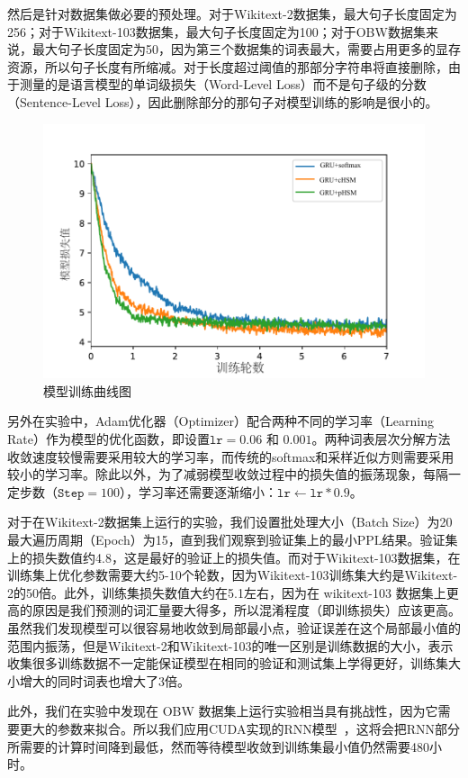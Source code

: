 然后是针对数据集做必要的预处理。对于Wikitext-2数据集，最大句子长度固定为256；对于Wikitext-103数据集，最大句子长度固定为100；对于OBW数据集来说，最大句子长度固定为50，因为第三个数据集的词表最大，需要占用更多的显存资源，所以句子长度有所缩减。对于长度超过阈值的那部分字符串将直接删除，由于测量的是语言模型的单词级损失（Word-Level Loss）而不是句子级的分数（Sentence-Level Loss），因此删除部分的那句子对模型训练的影响是很小的。
\begin{figure}[!t]
  \centering
  \includegraphics[width=0.6\columnwidth]{./figures/learn2.pdf}
  \caption{模型训练曲线图}
\end{figure}

另外在实验中，Adam优化器（Optimizer）配合两种不同的学习率（Learning Rate）作为模型的优化函数，即设置$\mathtt{lr}  = 0.06$ 和 $0.001 $。两种词表层次分解方法收敛速度较慢需要采用较大的学习率，而传统的softmax和采样近似方则需要采用较小的学习率。除此以外，为了减弱模型收敛过程中的损失值的振荡现象，每隔一定步数（$\texttt{Step} =100$），学习率还需要逐渐缩小：$\texttt{lr} \leftarrow \texttt{lr}*0.9$。

对于在Wikitext-2数据集上运行的实验，我们设置批处理大小（Batch Size）为20最大遍历周期（Epoch）为15，直到我们观察到验证集上的最小$\mathrm{PPL}$结果。验证集上的损失数值约4.8，这是最好的验证上的损失值。而对于Wikitext-103数据集，在训练集上优化参数需要大约5-10个轮数，因为Wikitext-103训练集大约是Wikitext-2的50倍。此外，训练集损失数值大约在5.1左右，因为在 wikitext-103 数据集上更高的原因是我们预测的词汇量要大得多，所以混淆程度（即训练损失）应该更高。虽然我们发现模型可以很容易地收敛到局部最小点，验证误差在这个局部最小值的范围内振荡，但是Wikitext-2和Wikitext-103的唯一区别是训练数据的大小，表示收集很多训练数据不一定能保证模型在相同的验证和测试集上学得更好，训练集大小增大的同时词表也增大了3倍。

此外，我们在实验中发现在 OBW 数据集上运行实验相当具有挑战性，因为它需要更大的参数来拟合。所以我们应用CUDA实现的RNN模型~，这将会把RNN部分所需要的计算时间降到最低，然而等待模型收敛到训练集最小值仍然需要480小时。

